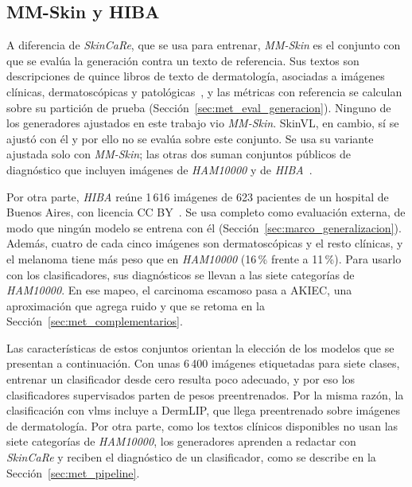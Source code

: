 \subsection{MM-Skin y HIBA}

A diferencia de \emph{SkinCaRe}, que se usa para entrenar, \emph{MM-Skin} es el conjunto con que se evalúa la
generación contra un texto de referencia. Sus textos son descripciones de quince libros de texto de dermatología,
asociadas a imágenes clínicas, dermatoscópicas y patológicas~\cite{zeng2025mmskin}, y las métricas con referencia se
calculan sobre su partición de prueba (Sección~\ref{sec:met_eval_generacion}). Ninguno de los generadores ajustados en
este trabajo vio \emph{MM-Skin}.
SkinVL, en cambio, sí se ajustó con él y por ello no se evalúa sobre este conjunto. Se usa su variante ajustada solo
con \emph{MM-Skin}; las otras dos suman conjuntos públicos de diagnóstico que incluyen imágenes de \emph{HAM10000} y
de \emph{HIBA}~\cite{zeng2025mmskin}.

Por otra parte, \emph{HIBA} reúne 1\,616 imágenes de 623 pacientes de un hospital de Buenos Aires, con licencia CC
BY~\cite{riccilara2023dataset}. Se usa completo como evaluación externa, de modo que ningún modelo se entrena con él (Sección~\ref{sec:marco_generalizacion}). Además, cuatro de cada cinco imágenes son
dermatoscópicas y el resto clínicas, y el melanoma tiene más peso que en \emph{HAM10000} (16\,\% frente a 11\,\%).
Para usarlo con los clasificadores, sus diagnósticos se llevan a las siete categorías de \emph{HAM10000}. En ese
mapeo, el carcinoma escamoso pasa a AKIEC, una aproximación que agrega ruido y que se retoma en la
Sección~\ref{sec:met_complementarios}.



Las características de estos conjuntos orientan la elección de los modelos que se presentan a continuación. Con unas
6\,400 imágenes etiquetadas para siete clases, entrenar un clasificador desde cero resulta poco adecuado, y por eso los
clasificadores supervisados parten de pesos preentrenados. Por la misma razón, la clasificación con \glspl{vlm} incluye
a DermLIP, que llega preentrenado sobre imágenes de dermatología. Por otra parte, como los textos clínicos disponibles
no usan las siete categorías de \emph{HAM10000}, los generadores aprenden a redactar con \emph{SkinCaRe} y reciben el
diagnóstico de un clasificador, como se describe en la Sección~\ref{sec:met_pipeline}.
